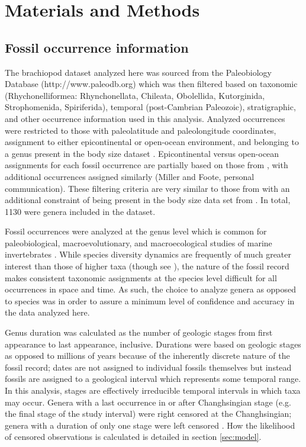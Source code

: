 \documentclass{article}
\begin{document}
\section{Materials and Methods}

\subsection{Fossil occurrence information}

The brachiopod dataset analyzed here was sourced from the Paleobiology Database (http://www.paleodb.org) which was then filtered based on taxonomic (Rhychonelliformea: Rhynchonellata, Chileata, Obolellida, Kutorginida, Strophomenida, Spiriferida), temporal (post-Cambrian Paleozoic), stratigraphic, and other occurrence information used in this analysis. Analyzed occurrences were restricted to those with paleolatitude and paleolongitude coordinates, assignment to either epicontinental or open-ocean environment, and belonging to a genus present in the body size dataset \citep{Payne2014}. Epicontinental versus open-ocean assignments for each fossil occurrence are partially based on those from \citet{Miller2009a}, with additional occurrences assigned similarly (Miller and Foote, personal communication). These filtering criteria are very similar to those from \citet{Foote2013} with an additional constraint of being present in the body size data set from \citet{Payne2014}. In total, 1130 were genera included in the dataset.

Fossil occurrences were analyzed at the genus level which is common for paleobiological, macroevolutionary, and macroecological studies of marine invertebrates \citep{Alroy2010,Foote2013,Harnik2013,Kiessling2007a,Miller2009a,Nurnberg2013a,Nurnberg2015,Payne2007,Simpson2009,Vilhena2013}. While species diversity dynamics are frequently of much greater interest than those of higher taxa (though see \citealt{Foote2014b,Hoehn2015}), the nature of the fossil record makes consistent taxonomic assignments at the species level difficult for all occurrences in space and time. As such, the choice to analyze genera as opposed to species was in order to assure a minimum level of confidence and accuracy in the data analyzed here.

Genus duration was calculated as the number of geologic stages from first appearance to last appearance, inclusive. Durations were based on geologic stages as opposed to millions of years because of the inherently discrete nature of the fossil record; dates are not assigned to individual fossils themselves but instead fossils are assigned to a geological interval which represents some temporal range. In this analysis, stages are effectively irreducible temporal intervals in which taxa may occur. Genera with a last occurrence in or after Changhsingian stage (e.g. the final stage of the study interval) were right censored at the Changhsingian; genera with a duration of only one stage were left censored \citep{Klein2003}. How the likelihood of censored observations is calculated is detailed in section \ref{sec:model}.
\end{document}

